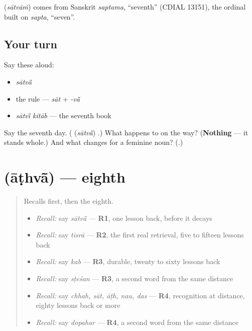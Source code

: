 \begin{cousinweb}
\textbf{} (\emph{sātvāṁ}) comes from Sanskrit \emph{saptama}, \textquotedblleft{}seventh\textquotedblright{} (CDIAL 13151), the ordinal built on \emph{sapta}, \textquotedblleft{}seven\textquotedblright{}.
\end{cousinweb}

\subsection*{Your turn}
Say these aloud:

\begin{itemize}
\raggedright
  \item \emph{sātvā̃}
  \item the rule — \emph{sāt} + \emph{-vā̃}
  \item \emph{sātvī̃ kitāb} — the seventh book
\end{itemize}

\begin{tcolorbox}[breakable,colback=teal!4,colframe=teal!35!black,title={Before you move on}]
Say the seventh day. (\textbf{} (\emph{sātvā̃}) \textbf{}.) What happens to \emph{} on the way? (\textbf{Nothing} — it stands whole.) And what changes for a feminine noun? (\textbf{}.)
\end{tcolorbox}
\section[\texorpdfstring{\hi{आठवाँ} / \hi{आठवीं} (āṭhvā̃ / āṭhvī̃)}{आठवाँ / आठवीं (āṭhvā̃ / āṭhvī̃)}]{ (āṭhvā̃) — eighth}

\label{lesson:HI-C76-eighth}



\begin{quote}
Recalls first, then the eighth.

\begin{itemize}
\raggedright
  \item \emph{Recall:} say \emph{sātvā̃} — \textbf{R1}, one lesson back, before it decays
  \item \emph{Recall:} say \emph{tīsrā} — \textbf{R2}, the first real retrieval, five to fifteen lessons back
  \item \emph{Recall:} say \emph{kab} — \textbf{R3}, durable, twenty to sixty lessons back
  \item \emph{Recall:} say \emph{sṭeśan} — \textbf{R3}, a second word from the same distance
  \item \emph{Recall:} say \emph{chhah, sāt, āṭh, nau, das} — \textbf{R4}, recognition at distance, eighty lessons back or more
  \item \emph{Recall:} say \emph{dopahar} — \textbf{R4}, a second word from the same distance
\end{itemize}
\end{quote}

